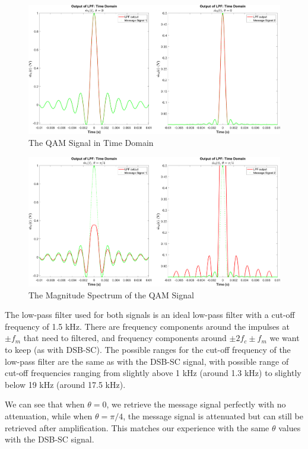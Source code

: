 \documentclass[12pt]{article}
\begin{document}
\begin{figure}[h]
    \centering
    \includegraphics[width=\textwidth]{qam_demod_lpf_theta_0}
    \caption{\label{fig:qam_demod_lpf_0}The QAM Signal in Time Domain}
\end{figure}
\begin{figure}[h]
    \centering
    \includegraphics[width=\textwidth]{qam_demod_lpf_theta_0.7854}
    \caption{\label{fig:qam_demod_lpf_p4}The Magnitude Spectrum of the QAM Signal}
\end{figure}

The low-pass filter used for both signals is an ideal low-pass filter with a cut-off frequency of 1.5 kHz. There are frequency components around the impulses at $\pm f_m$ that need to filtered, and frequency components around $\pm 2f_c \pm f_m$ we want to keep (as with DSB-SC). The possible ranges for the cut-off frequency of the low-pass filter are the same as with the DSB-SC signal, with possible range of cut-off frequencies ranging from slightly above 1 kHz (around 1.3 kHz) to slightly below 19 kHz (around 17.5 kHz). %

We can see that when $\theta = 0$, we retrieve the message signal perfectly with no attenuation, while when $\theta = \pi/4$, the message signal is attenuated but can still be retrieved after amplification. This matches our experience with the same $\theta$ values with the DSB-SC signal. 
\end{document}
